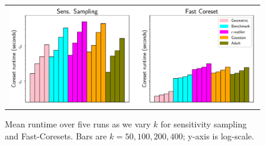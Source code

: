 \begin{figure}
    \centering
    \begin{tabular}{c}
        \includegraphics[width=.95\linewidth]{images/2/coreset_runtime-Effect_of_k_for_sens_sampling.pdf}
    \end{tabular}
    \caption{Mean runtime over five runs as we vary $k$ for sensitivity sampling and Fast-Coresets. Bars are $k=50, 100, 200, 400$; y-axis is log-scale.}
    \label{fig:coreset_size_on_sens_quality}
\end{figure}
